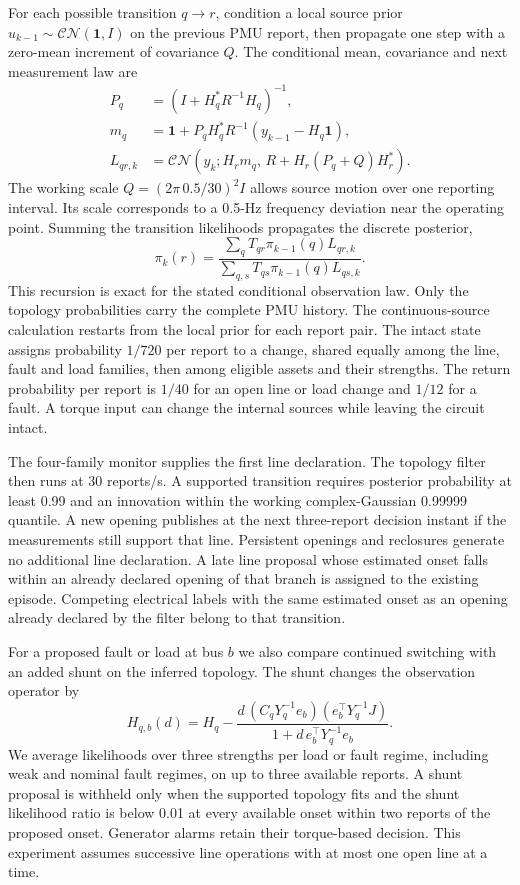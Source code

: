 For each possible transition $q\to r$, condition a local source prior
$u_{k-1}\sim\mathcal{CN}(\mathbf{1},I)$ on the previous PMU report,
then propagate one step with a zero-mean increment of covariance $Q$.
The conditional mean, covariance and next measurement law are
\begin{align*}
 P_q&=(I+H_q^*R^{-1}H_q)^{-1},\\
 m_q&=\mathbf{1}+P_qH_q^*R^{-1}(y_{k-1}-H_q\mathbf{1}),\\
 L_{qr,k}&=\mathcal{CN}\!\left(y_k;H_rm_q,\,
                  R+H_r(P_q+Q)H_r^*\right).
\end{align*}
The working scale $Q=(2\pi\,0.5/30)^2I$ allows source motion
over one reporting interval. Its scale corresponds to a 0.5-Hz
frequency deviation near the operating point. Summing the transition
likelihoods propagates the discrete posterior,
\[
 \pi_k(r)=
 \frac{\sum_q T_{qr}\pi_{k-1}(q)L_{qr,k}}
      {\sum_{q,s}T_{qs}\pi_{k-1}(q)L_{qs,k}} .
\]
This recursion is exact for the stated conditional observation law.
Only the topology probabilities carry the complete PMU history.
The continuous-source calculation restarts from the local prior
for each report pair. The intact state assigns probability $1/720$
per report to a change, shared equally among the line, fault and load
families, then among eligible assets and their strengths. The return
probability per report is $1/40$ for an open line or load change and
$1/12$ for a fault. A torque input can change the internal sources
while leaving the circuit intact.

The four-family monitor supplies the first line declaration.
The topology filter then runs at 30 reports/s. A supported transition
requires posterior probability at least 0.99 and an innovation within
the working complex-Gaussian 0.99999 quantile. A new opening publishes
at the next three-report decision instant if the measurements still
support that line. Persistent openings and reclosures generate no
additional line declaration. A late line proposal whose estimated
onset falls within an already declared opening of that branch is
assigned to the existing episode.
Competing electrical labels with the same estimated onset as an
opening already declared by the filter belong to that transition.

For a proposed fault or load at bus $b$ we also compare continued
switching with an added shunt on the inferred topology. The shunt
changes the observation operator by
\[
 H_{q,b}(d)=H_q-
 \frac{d\,(C_qY_q^{-1}e_b)(e_b^\top Y_q^{-1}J)}
      {1+d\, e_b^\top Y_q^{-1}e_b}.
\]
We average likelihoods over three strengths per load or fault regime,
including weak and nominal fault regimes, on up to three available
reports. A shunt proposal is withheld only when the supported topology
fits and the shunt likelihood ratio is below 0.01 at every available
onset within two reports of the proposed onset. Generator alarms
retain their torque-based decision. This experiment assumes successive
line operations with at most one open line at a time.


